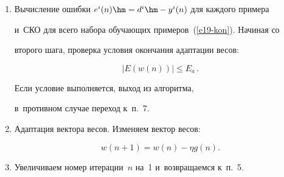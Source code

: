 \begin{enumerate}[1.]
\noindent


$$


y^i(n)= \Psi^{\mathrm{T}}(\tau^i) w(n)\enskip \left(i= \overline{1,N}\right).


$$





\vspace*{-2pt}





\item Вычисление ошибки $e^i(n)\hm= d^i\hm- y^i(n)$ для каждого примера 


и~СКО для всего набора обучающих примеров~(\ref{e19-kon}). Начиная со 


второго шага, проверка условия окончания адаптации весов: 





\noindent


$$


\vert E(w(n)) 


\vert \leq E_a\,.


$$





\vspace*{-2pt}





\noindent


 Если условие выполняется, выход из алгоритма, 


в~противном случае переход к~п.~7.\\[-13pt]


\item Адаптация вектора весов. Изменяем вектор весов:





\noindent


$$


w(n+1)=w(n)-\eta g(n).


$$





\vspace*{-2pt}





\item Увеличиваем номер итерации~$n$ на~1 и~возвращаемся к~п.~5.


\end{enumerate}


